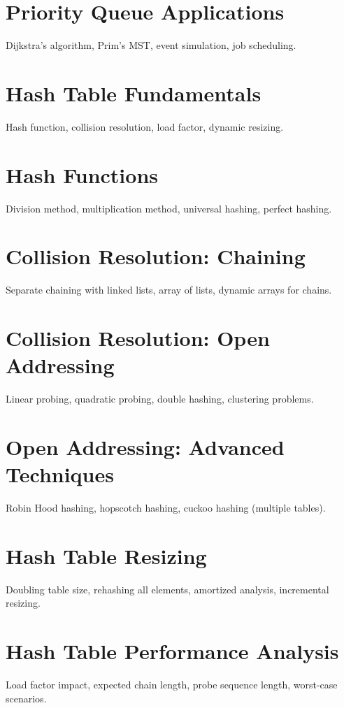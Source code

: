 \chapter{Priority Queue Applications}
Dijkstra's algorithm, Prim's MST, event simulation, job scheduling.


\chapter{Hash Table Fundamentals}
Hash function, collision resolution, load factor, dynamic resizing.

\chapter{Hash Functions}
Division method, multiplication method, universal hashing, perfect hashing.

\chapter{Collision Resolution: Chaining}
Separate chaining with linked lists, array of lists, dynamic arrays for chains.

\chapter{Collision Resolution: Open Addressing}
Linear probing, quadratic probing, double hashing, clustering problems.

\chapter{Open Addressing: Advanced Techniques}
Robin Hood hashing, hopscotch hashing, cuckoo hashing (multiple tables).

\chapter{Hash Table Resizing}
Doubling table size, rehashing all elements, amortized analysis, incremental resizing.

\chapter{Hash Table Performance Analysis}
Load factor impact, expected chain length, probe sequence length, worst-case scenarios.

